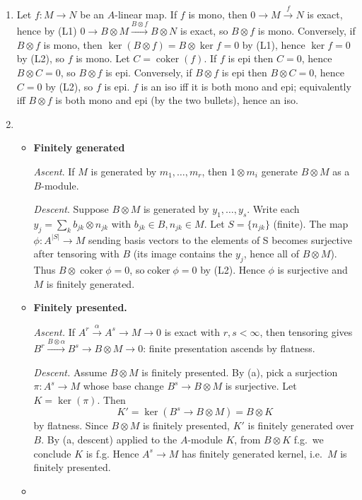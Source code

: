 \documentclass[12pt]{article}
\begin{document}
\begin{enumerate}
    \item Let $f:M\to N$ be an $A$-linear map. If $f$ is mono, then $0\to M\xrightarrow{f}N$ is exact, hence by (L1) $0\to B\otimes M \xrightarrow{B\otimes f} B\otimes N$ is exact, so $B\otimes f$ is mono. Conversely, if $B\otimes f$ is mono, then $\ker(B\otimes f)=B\otimes\ker f=0$ by (L1), hence $\ker f=0$ by (L2), so $f$ is mono. Let $C=\operatorname{coker}(f)$. If $f$ is epi then $C=0$, hence $B\otimes C=0$, so $B\otimes f$ is epi. Conversely, if $B\otimes f$ is epi then $B\otimes C=0$, hence $C=0$ by (L2), so $f$ is epi. $f$ is an iso iff it is both mono and epi; equivalently iff $B\otimes f$ is both mono and epi (by the two bullets), hence an iso.
    \item
    \begin{itemize}
        \item \textbf{Finitely generated}

        \textit{Ascent}. If $M$ is generated by $m_1,\dots,m_r$, then $1\otimes m_i$ generate $B\otimes M$ as a $B$-module.

        \textit{Descent}. Suppose $B\otimes M$ is generated by $y_1,\dots,y_s$. Write each $y_j=\sum_k b_{jk}\otimes n_{jk} $ with $ b_{jk}\in B, n_{jk}\in M$. Let $S=\{n_{jk}\}$ (finite). The map $\phi:A^{|S|}\to M$ sending basis vectors to the elements of S becomes surjective after tensoring with $B$ (its image contains the $y_j$, hence all of $B\otimes M$). Thus $B\otimes\operatorname{coker}\phi=0$, so$ \operatorname{coker}\phi=0$ by (L2). Hence $\phi$ is surjective and $M$ is finitely generated.

\item \textbf{Finitely presented.} 

\textit{Ascent.} If $A^r\xrightarrow{\alpha}A^s\to M\to 0$ is exact with $r,s<\infty$, then tensoring gives $B^r\xrightarrow{B\otimes\alpha}B^s\to B\otimes M\to 0$: finite presentation ascends by flatness. 

\textit{Descent.} Assume $B\otimes M$ is finitely presented. By (a), pick a surjection $\pi:A^s\to M$ whose base change $B^s\to B\otimes M$ is surjective. Let $K=\ker(\pi)$. Then $$K'=\ker(B^s\to B\otimes M)=B\otimes K$$ by flatness. Since $B\otimes M$ is finitely presented, $K'$ is finitely generated over $B$. By (a, descent) applied to the $A$-module $K$, from $B\otimes K$ f.g.\ we conclude $K$ is f.g. Hence $A^s\to M$ has finitely generated kernel, i.e.\ $M$ is finitely presented.

\item {}


\end{itemize}
\end{enumerate}
\end{document}
